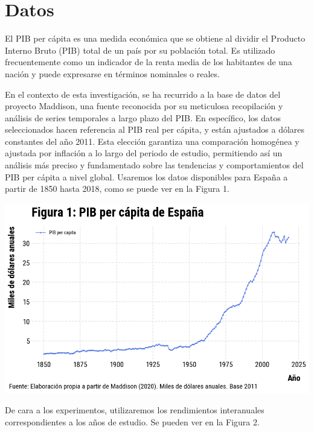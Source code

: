 \documentclass[12pt]{article}
\begin{document}
\section{Datos}

El PIB per cápita es una medida económica que se obtiene al dividir el Producto Interno Bruto (PIB) total de un país por su población total. Es utilizado frecuentemente como un indicador de la renta media de los habitantes de una nación y puede expresarse en términos nominales o reales.

En el contexto de esta investigación, se ha recurrido a la base de datos del proyecto Maddison, una fuente reconocida por su meticulosa recopilación y análisis de series temporales a largo plazo del PIB. En específico, los datos seleccionados hacen referencia al PIB real per cápita, y están ajustados a dólares constantes del año 2011. Esta elección garantiza una comparación homogénea y ajustada por inflación a lo largo del periodo de estudio, permitiendo así un análisis más preciso y fundamentado sobre las tendencias y comportamientos del PIB per cápita a nivel global.	Usaremos los datos disponibles para España a partir de 1850 hasta 2018, como se puede ver en la Figura 1.

\begin{center}
\includegraphics[scale=0.57]{fig_1_pibpc}
\end{center}

De cara a los experimentos, utilizaremos los rendimientos interanuales correspondientes a los años de estudio. Se pueden ver en la Figura 2.
\end{document}

